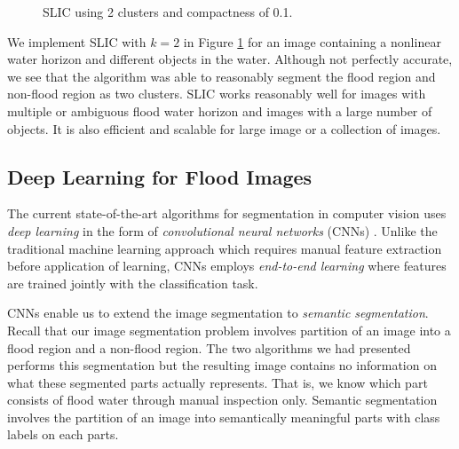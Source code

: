\documentclass[review]{elsarticle}
\begin{document}
\begin{figure}[h!]
\begin{minipage}{.5\linewidth}
\end{minipage}\par\medskip
\centering
{}
\caption{SLIC using 2 clusters and compactness of 0.1.}
\label{fig:slic}
\end{figure}

We implement SLIC with $k=2$ in Figure \ref{fig:slic} for an image containing a nonlinear water horizon and different objects in the water. Although not perfectly accurate, we see that the algorithm was able to reasonably segment the flood region and non-flood region as two clusters. SLIC works reasonably well for images with multiple or ambiguous flood water horizon and images with a large number of objects. It is also efficient and scalable for large image or a collection of images.

\subsection{Deep Learning for Flood Images}

The current state-of-the-art algorithms for segmentation in computer vision uses \emph{deep learning} in the form of \emph{convolutional neural networks} (CNNs) \cite{schmidhuber, long, girshick}. Unlike the traditional machine learning approach which requires manual feature extraction before application of learning, CNNs employs \emph{end-to-end learning} where features are trained jointly with the classification task.

CNNs enable us to extend the image segmentation to \emph{semantic segmentation}. Recall that our image segmentation problem involves partition of an image into a flood region and a non-flood region. The two algorithms we had presented performs this segmentation but the resulting image contains no information on what these segmented parts actually represents. That is, we know which part consists of flood water through manual inspection only. Semantic segmentation involves the partition of an image into semantically meaningful parts with class labels on each parts.
\end{document}
